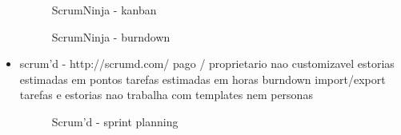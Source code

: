 \begin{itemize}
\begin{figure}[htbp]
  \centering
  \caption{ScrumNinja - kanban}
\end{figure}

\begin{figure}[htbp]
  \centering
  \caption{ScrumNinja - burndown}
\end{figure}

\item scrum'd - http://scrumd.com/
pago / proprietario
nao customizavel
estorias estimadas em pontos
tarefas estimadas em horas
burndown
import/export tarefas e estorias
nao trabalha com templates nem personas

\begin{figure}[htbp]
  \centering
  \caption{Scrum'd - sprint planning}
\end{figure}


\end{itemize}
